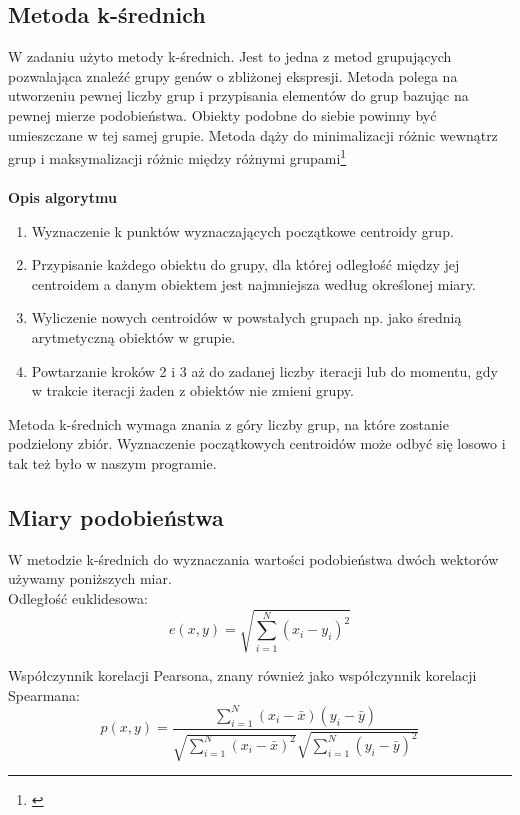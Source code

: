 \documentclass{classrep}
\begin{document}
\subsection{Metoda k-średnich}
W zadaniu użyto metody k-średnich. Jest to jedna z metod grupujących pozwalająca znaleźć grupy genów o zbliżonej ekspresji. Metoda polega na utworzeniu pewnej liczby grup i przypisania elementów do grup bazując na pewnej mierze podobieństwa. Obiekty podobne do siebie powinny być umieszczane w tej samej grupie. Metoda dąży do minimalizacji różnic wewnątrz grup i maksymalizacji różnic między różnymi grupami\footnote{\cite{metodyklasyfikacji}}\\\\
\textbf{Opis algorytmu}
\begin{enumerate}

\item Wyznaczenie k punktów wyznaczających początkowe centroidy grup.

\item Przypisanie każdego obiektu do grupy, dla której odległość między jej centroidem a danym obiektem jest najmniejsza według określonej miary.

\item Wyliczenie nowych centroidów w powstałych grupach np. jako średnią arytmetyczną obiektów w grupie.

\item Powtarzanie kroków 2 i 3 aż do zadanej liczby iteracji lub do momentu, gdy w trakcie iteracji żaden z obiektów nie zmieni grupy.\\
\end{enumerate}
Metoda k-średnich wymaga znania z góry liczby grup, na które zostanie podzielony zbiór. Wyznaczenie początkowych centroidów może odbyć się losowo i tak też było w naszym programie.
\subsection{Miary podobieństwa}
W metodzie k-średnich do wyznaczania wartości podobieństwa dwóch wektorów używamy poniższych miar.\\

Odległość euklidesowa:
\begin{equation}
  e(x, y) = \sqrt{\displaystyle \sum_{i = 1}^{N} (x_i - y_i)^2}
\end{equation}

Współczynnik korelacji Pearsona, znany również jako współczynnik korelacji Spearmana:
\begin{equation}
  p(x,y) = \frac{\displaystyle\sum_{i = 1}^{N}(x_i - \bar{x})(y_i -
\bar{y})}{\sqrt{\displaystyle \sum_{i=1}^N (x_i - \bar{x})^2}\sqrt{\displaystyle
\sum_{i=1}^N (y_i - \bar{y})^2}}
\end{equation}
\end{document}
